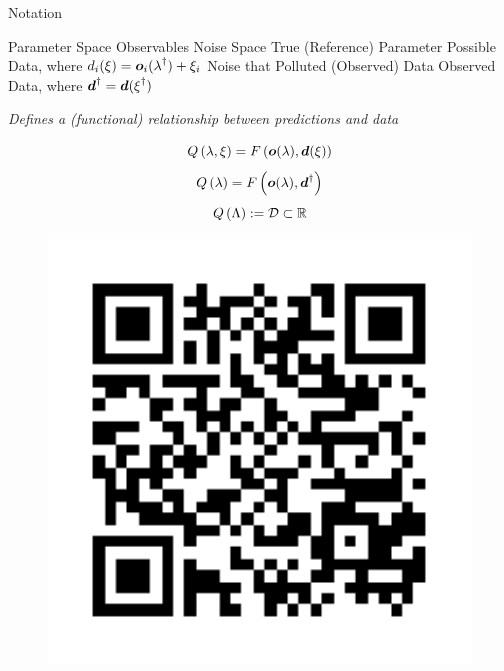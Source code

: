 \begin{block}{Notation}
\large
    \begin{itemize}
         Parameter Space
         Observables
         Noise Space
        \itembox{$\param^\dagger\in\pspace$} True (Reference) Parameter
         Possible Data, where $d_i(\operatorname*{\xi}) = \boldsymbol{o}_i(\operatorname*{\lambda}^\dagger) + \xi_i$
        \itembox{$\noise^\dagger\in\nspace$} Noise that Polluted (Observed) Data
         Observed Data, where $\boldsymbol{d}^\dagger = \boldsymbol{d}(\operatorname*{\xi}^\dagger)$
    \end{itemize}

\Large
    \emph{\Large Defines a (functional) relationship between predictions and data}

        $$Q \left (\operatorname*{\lambda}, \operatorname*{\xi} \right ) = F \left ( \boldsymbol{o}(\operatorname*{\lambda}), \boldsymbol{d}(\operatorname*{\xi}) \right ) $$
        $$Q \left (\operatorname*{\lambda} \right ) = F \left ( \boldsymbol{o}(\operatorname*{\lambda}), \boldsymbol{d}^\dagger \right )$$
        $$Q \left ( \Lambda \right ) := \mathcal{D} \subset \mathbb{R}$$
\normalsize
    \begin{figure}
        \includegraphics[width=20cm]{ref1}
    \end{figure}

\end{block}
\vspace{-1cm}
